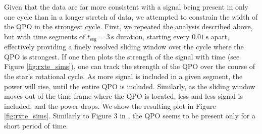\documentclass{emulateapj}
\begin{document}
Given that the data are far more consistent with a signal being present in only one cycle than in a longer stretch of data, we attempted to constrain the width of the QPO in the strongest cycle. First, we repeated the analysis described above, but with time segments of $t_{\mathrm{seg}} = 3 \, \mathrm{s}$ duration, starting every $0.01\,\mathrm{s}$ apart, effectively providing a finely resolved sliding window over the cycle where the QPO is strongest. If one then plots the strength of the signal with time (see Figure \ref{fig:rxte_sims}), one can track the strength of the QPO over the course of the star's rotational cycle. As more signal is included in a given segment, the power will rise, until the entire QPO is included. Similarly, as the sliding window moves out of the time frame where the QPO is located, less and less signal is included, and the power drops. We show the resulting plot in Figure \ref{fig:rxte_sims}. Similarly to Figure 3 in \citet{Strohmayer06}, the QPO seems to be present only for a short period of time. 
\end{document}
